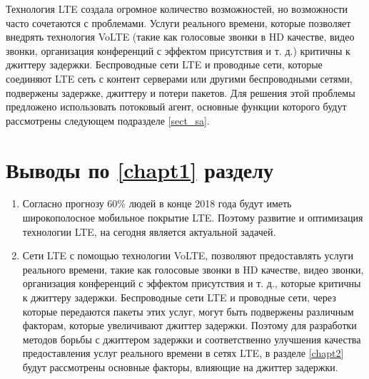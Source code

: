 Технология LTE создала огромное количество возможностей, но возможности часто сочетаются с проблемами. Услуги реального времени, которые позволяет внедрять технология VoLTE (такие как голосовые звонки в HD качестве, видео звонки, организация конференций с эффектом присутствия и т. д.) критичны к джиттеру задержки. Беспроводные сети LTE и проводные сети, которые соединяют LTE сеть с контент серверами или другими беспроводными сетями, подвержены задержке, джиттеру и потери пакетов. Для решения этой проблемы предложено использовать потоковый агент, основные функции которого будут рассмотрены следующем подразделе \ref{sect_sa}. 



\section{Выводы по \ref{chapt1} разделу } \label{sect_conclus1}

\begin{enumerate}
\item Согласно прогнозу \cite{ericsson} 60\% людей в конце 2018 года будут иметь широкополосное мобильное покрытие LTE. Поэтому развитие и оптимизация технологии LTE, на сегодня является актуальной задачей.

\item Сети LTE с помощью технологии VoLTE, позволяют предоставлять услуги реального времени, такие как голосовые звонки в HD качестве, видео звонки, организация конференций с эффектом присутствия и т. д., которые критичны к джиттеру задержки. Беспроводные сети LTE и проводные сети, через которые передаются пакеты этих услуг, могут быть подвержены различным факторам, которые увеличивают джиттер задержки. Поэтому для разработки методов борьбы с джиттером задержки и соответственно улучшения качества предоставления услуг реального времени в сетях LTE, в разделе \ref{chapt2} будут рассмотрены основные факторы, влияющие на джиттер задержки.



\end{enumerate}

\clearpage




